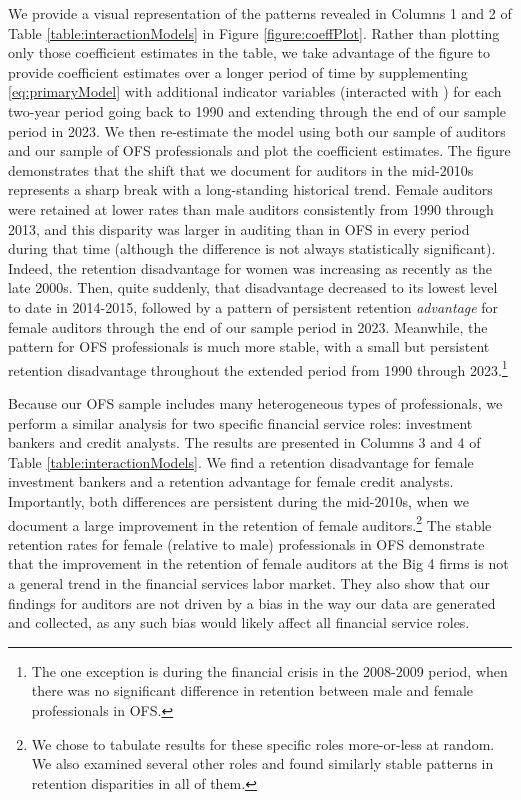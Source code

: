 \documentclass[11pt]{article}
\begin{document}
        We provide a visual representation of the patterns revealed in Columns 1 and 2 of Table \ref{table:interactionModels} in Figure \ref{figure:coeffPlot}. Rather than plotting only those coefficient estimates in the table, we take advantage of the figure to provide coefficient estimates over a longer period of time by supplementing \ref{eq:primaryModel} with additional indicator variables (interacted with \FEMALE) for each two-year period going back to 1990 and extending through the end of our sample period in 2023. We then re-estimate the model using both our sample of auditors and our sample of OFS professionals and plot the coefficient estimates. The figure demonstrates that the shift that we document for auditors in the mid-2010s represents a sharp break with a long-standing historical trend. Female auditors were retained at lower rates than male auditors consistently from 1990 through 2013, and this disparity was larger in auditing than in OFS in every period during that time (although the difference is not always statistically significant). Indeed, the retention disadvantage for women was increasing as recently as the late 2000s. Then, quite suddenly, that disadvantage decreased to its lowest level to date in 2014-2015, followed by a pattern of persistent retention \textit{advantage} for female auditors through the end of our sample period in 2023. Meanwhile, the pattern for OFS professionals is much more stable, with a small but persistent retention disadvantage throughout the extended period from 1990 through 2023.\footnote{The one exception is during the financial crisis in the 2008-2009 period, when there was no significant difference in retention between male and female professionals in OFS.}

        Because our OFS sample includes many heterogeneous types of professionals, we perform a similar analysis for two specific financial service roles: investment bankers and credit analysts. The results are presented in Columns 3 and 4 of Table \ref{table:interactionModels}. We find a retention disadvantage for female investment bankers and a retention advantage for female credit analysts. Importantly, both differences are persistent during the mid-2010s, when we document a large improvement in the retention of female auditors.\footnote{We chose to tabulate results for these specific roles more-or-less at random. We also examined several other roles and found similarly stable patterns in retention disparities in all of them.} The stable retention rates for female (relative to male) professionals in OFS demonstrate that the improvement in the retention of female auditors at the Big 4 firms is not a general trend in the financial services labor market. They also show that our findings for auditors are not driven by a bias in the way our data are generated and collected, as any such bias would likely affect all financial service roles. 
\end{document}
